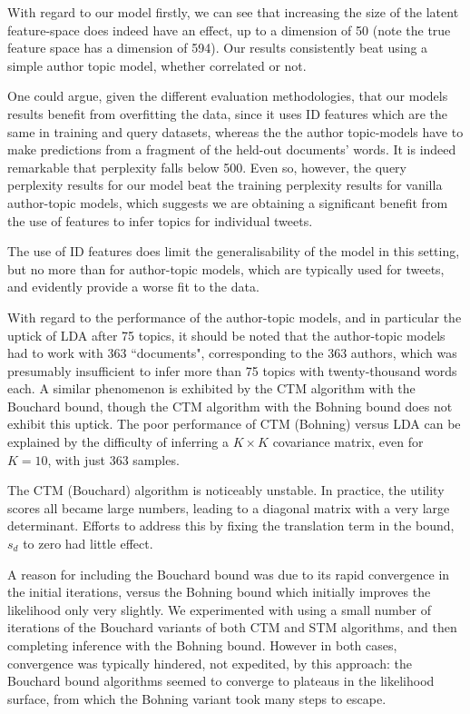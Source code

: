 With regard to our model firstly, we can see that increasing the size of the latent feature-space does indeed have an effect, up to a dimension of 50 (note the true feature space has a dimension of 594). Our results consistently beat using a simple author topic model, whether correlated or not.

One could argue, given the different evaluation methodologies, that our models results benefit from overfitting the data, since it uses ID features which are the same in training and query datasets, whereas the the author topic-models have to make predictions from a fragment of the held-out documents' words. It is indeed remarkable that perplexity falls below 500. Even so, however, the query perplexity results for our model beat the training perplexity results for vanilla author-topic models, which suggests we are obtaining a significant benefit from the use of features to infer topics for individual tweets.

The use of ID features does limit the generalisability of the model in this setting, but no more than for author-topic models, which are typically used for tweets, and evidently provide a worse fit to the data. 

With regard to the performance of the author-topic models, and in particular the uptick of LDA after 75 topics, it should be noted that the author-topic models had to work with 363 ``documents", corresponding to the 363 authors, which was presumably insufficient to infer more than 75 topics with twenty-thousand words each. A similar phenomenon is exhibited by the CTM algorithm with the Bouchard bound, though the CTM algorithm with the Bohning bound does not exhibit this uptick. The poor performance of CTM (Bohning) versus LDA can be explained by the difficulty of inferring a $K \times K$ covariance matrix, even for $K=10$, with just 363 samples.

The CTM (Bouchard) algorithm is noticeably unstable. In practice, the utility scores all became large numbers, leading to a diagonal matrix with a very large determinant. Efforts to address this by fixing the translation term in the bound, $s_d$ to zero had little effect. 

A reason for including the Bouchard bound was due to its rapid convergence in the initial iterations, versus the Bohning bound which initially improves the likelihood only very slightly. We experimented with using a small number of iterations of the Bouchard variants of both CTM and STM algorithms, and then completing inference with the Bohning bound. However in both cases, convergence was typically hindered, not expedited, by this approach: the Bouchard bound algorithms seemed to converge to plateaus in the likelihood surface, from which the Bohning variant took many steps to escape.

